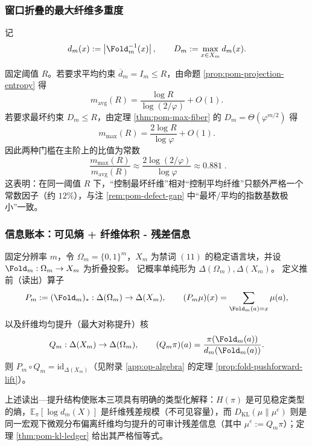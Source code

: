 \subsubsection{窗口折叠的最大纤维多重度}\label{subsec:pom-max-fiber}
记
\[
d_m(x):=\left|\Fold_m^{-1}(x)\right|,
\qquad
D_m:=\max_{x\in X_m} d_m(x).
\]

\begin{remark}\label{rem:pom-avg-vs-max-threshold}
固定阈值 $R$。若要求平均约束 $\overline d_m=I_m\le R$，由命题 \ref{prop:pom-projection-entropy} 得
\[
m_{\mathrm{avg}}(R)=\frac{\log R}{\log(2/\varphi)}+O(1).
\]
若要求最坏约束 $D_m\le R$，由定理 \ref{thm:pom-max-fiber} 的 $D_m=\Theta(\varphi^{m/2})$ 得
\[
m_{\max}(R)=\frac{2\log R}{\log\varphi}+O(1).
\]
因此两种门槛在主阶上的比值为常数
\[
\boxed{\;
\frac{m_{\max}(R)}{m_{\mathrm{avg}}(R)}
\approx
\frac{2\log(2/\varphi)}{\log\varphi}
\approx 0.881\; }.
\]
这表明：在同一阈值 $R$ 下，“控制最坏纤维”相对“控制平均纤维”只额外严格一个常数因子（约 $12\%$），与注 \ref{rem:pom-defect-gap} 中“最坏/平均的指数基数极小”一致。
\end{remark}
\subsubsection{信息账本：可见熵 + 纤维体积 - 残差信息}\label{subsec:pom-information-ledger}
固定分辨率 $m$，令 $\Omega_m=\{0,1\}^m$，$X_m$ 为禁词 $(11)$ 的稳定语言块，并设 $\Fold_m:\Omega_m\to X_m$ 为折叠投影。
记概率单纯形为 $\Delta(\Omega_m),\Delta(X_m)$。
定义推前（读出）算子
\[
P_m:=(\Fold_m)_*:\Delta(\Omega_m)\to\Delta(X_m),
\qquad
(P_m\mu)(x)=\sum_{\Fold_m(a)=x}\mu(a),
\]
以及纤维均匀提升（最大对称提升）核
\[
Q_m:\Delta(X_m)\to\Delta(\Omega_m),
\qquad
(Q_m\pi)(a)=\frac{\pi(\Fold_m(a))}{d_m(\Fold_m(a))}.
\]
则 $P_m\circ Q_m=\mathrm{id}_{\Delta(X_m)}$（见附录 \ref{app:op-algebra} 的定理 \ref{prop:fold-pushforward-lift}）。

上述读出—提升结构使账本三项具有明确的类型化解释：$H(\pi)$ 是可见稳定类型的熵，$\mathbb{E}_{\pi}[\log d_m(X)]$ 是纤维残差规模（不可见容量），而 $D_{\mathrm{KL}}(\mu\|\mu^{e})$ 则是同一宏观下微观分布偏离纤维均匀提升的可审计残差信息（其中 $\mu^{e}:=Q_m\pi$）；定理 \ref{thm:pom-kl-ledger} 给出其严格恒等式。

